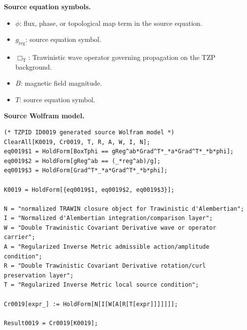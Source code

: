 \begin{minipage}[t]{0.49\linewidth}
\begingroup
\small
\raggedright
\textbf{Source equation symbols.}\par
\begin{itemize}[leftmargin=1.35em,itemsep=1pt,topsep=1pt,parsep=0pt]
    \item $\phi$: flux, phase, or topological map term in the source equation.
    \item $g_{\mathrm{reg}}$: source equation symbol.
    \item $\Box_{\mathrm{T}}$: Trawinistic wave operator governing propagation on the TZP background.
    \item $B$: magnetic field magnitude.
    \item $T$: source equation symbol.
\end{itemize}
\endgroup
\end{minipage}\hfill
\begin{minipage}[t]{0.47\linewidth}
\begingroup
\scriptsize
\raggedright
\textbf{Source Wolfram model.}\par
\begin{Verbatim}[fontsize=\tiny,breaklines=true,breakanywhere=true]
(* TZPID ID0019 generated source Wolfram model *)
ClearAll[K0019, Cr0019, T, R, A, W, I, N];
eq0019$1 = HoldForm[BoxTphi == gReg^ab*Grad^T*_*a*Grad^T*_*b*phi];
eq0019$2 = HoldForm[gReg^ab == (_*reg^ab)/g];
eq0019$3 = HoldForm[Grad^T*_*a*Grad^T*_*b*phi];

K0019 = HoldForm[{eq0019$1, eq0019$2, eq0019$3}];

N = "normalized TRAWIN closure object for Trawinistic d'Alembertian";
I = "Normalized d'Alembertian integration/comparison layer";
W = "Double Trawinistic Covariant Derivative wave or operator carrier";
A = "Regularized Inverse Metric admissible action/amplitude condition";
R = "Double Trawinistic Covariant Derivative rotation/curl preservation layer";
T = "Regularized Inverse Metric local source condition";

Cr0019[expr_] := HoldForm[N[I[W[A[R[T[expr]]]]]]];

Result0019 = Cr0019[K0019];
\end{Verbatim}
\endgroup
\end{minipage}

